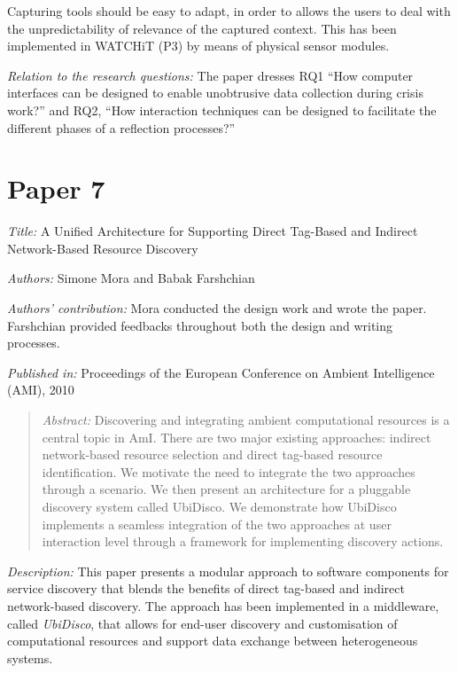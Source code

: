 Capturing tools should be easy to adapt, in order to allows the users to deal with the unpredictability of relevance of the captured context. This has been implemented in WATCHiT (P3) by means of physical sensor modules.

\emph{Relation to the research questions: } The paper dresses RQ1 ``How computer interfaces can be designed to enable unobtrusive data collection during crisis work?'' and RQ2, ``How interaction techniques can be designed to facilitate the different phases of a reflection processes?''

\section[A Unified Architecture for Supporting Direct Tag-Based and Indirect Network-Based Resource Discovery]{Paper 7}\label{paper-7}

\emph{Title:} A Unified Architecture for Supporting Direct Tag-Based and Indirect Network-Based Resource Discovery

\emph{Authors:} Simone Mora and Babak Farshchian

\emph{Authors' contribution:} Mora conducted the design work and wrote the paper. Farshchian provided feedbacks throughout both the design and writing processes.~

\emph{Published in:} Proceedings of the European Conference on Ambient Intelligence (AMI), 2010
\begin{quote}
	\emph{Abstract:} Discovering and integrating ambient computational resources is a central topic in AmI. There are two major existing approaches: indirect network-based resource selection and direct tag-based resource identification. We motivate the need to integrate the two approaches through a scenario. We then present an architecture for a pluggable discovery system called UbiDisco. We demonstrate how UbiDisco implements a seamless integration of the two approaches at user interaction level through a framework for implementing discovery actions. 
\end{quote}

\emph{Description:} This paper presents a modular approach to software components for service discovery that blends the benefits of direct tag-based and indirect network-based discovery. The approach has been implemented in a middleware, called \emph{UbiDisco}, that allows for end-user discovery and customisation of computational resources and support data exchange between heterogeneous systems.

